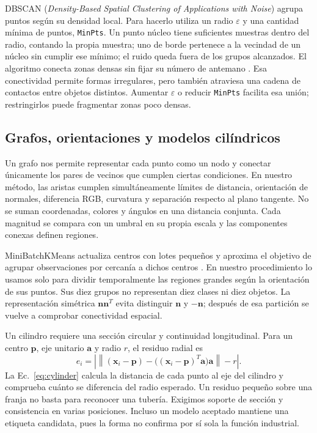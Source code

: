 \documentclass[journal,onecolumn]{IEEEtran}
\begin{document}
DBSCAN (\textit{Density-Based Spatial Clustering of Applications with Noise}) agrupa puntos según su densidad local. Para hacerlo utiliza un radio $\varepsilon$ y una cantidad mínima de puntos, \texttt{MinPts}. Un punto núcleo tiene suficientes muestras dentro del radio, contando la propia muestra; uno de borde pertenece a la vecindad de un núcleo sin cumplir ese mínimo; el ruido queda fuera de los grupos alcanzados. El algoritmo conecta zonas densas sin fijar su número de antemano \cite{dbscan}. Esa conectividad permite formas irregulares, pero también atraviesa una cadena de contactos entre objetos distintos. Aumentar $\varepsilon$ o reducir \texttt{MinPts} facilita esa unión; restringirlos puede fragmentar zonas poco densas.

\subsection{Grafos, orientaciones y modelos cilíndricos}
Un grafo nos permite representar cada punto como un nodo y conectar únicamente los pares de vecinos que cumplen ciertas condiciones. En nuestro método, las aristas cumplen simultáneamente límites de distancia, orientación de normales, diferencia RGB, curvatura y separación respecto al plano tangente. No se suman coordenadas, colores y ángulos en una distancia conjunta. Cada magnitud se compara con un umbral en su propia escala y las componentes conexas definen regiones.

MiniBatchKMeans actualiza centros con lotes pequeños y aproxima el objetivo de agrupar observaciones por cercanía a dichos centros \cite{sculley}. En nuestro procedimiento lo usamos solo para dividir temporalmente las regiones grandes según la orientación de sus puntos. Sus diez grupos no representan diez clases ni diez objetos. La representación simétrica $\mathbf{n}\mathbf{n}^T$ evita distinguir $\mathbf{n}$ y $-\mathbf{n}$; después de esa partición se vuelve a comprobar conectividad espacial.

Un cilindro requiere una sección circular y continuidad longitudinal. Para un centro $\mathbf{p}$, eje unitario $\mathbf{a}$ y radio $r$, el residuo radial es
\begin{equation}e_i=\left|\left\|(\mathbf{x}_i-\mathbf{p})-\big((\mathbf{x}_i-\mathbf{p})^T\mathbf{a}\big)\mathbf{a}\right\|-r\right|.\label{eq:cylinder}\end{equation}
La Ec.~\eqref{eq:cylinder} calcula la distancia de cada punto al eje del cilindro y comprueba cuánto se diferencia del radio esperado. Un residuo pequeño sobre una franja no basta para reconocer una tubería. Exigimos soporte de sección y consistencia en varias posiciones. Incluso un modelo aceptado mantiene una etiqueta candidata, pues la forma no confirma por sí sola la función industrial.
\end{document}
